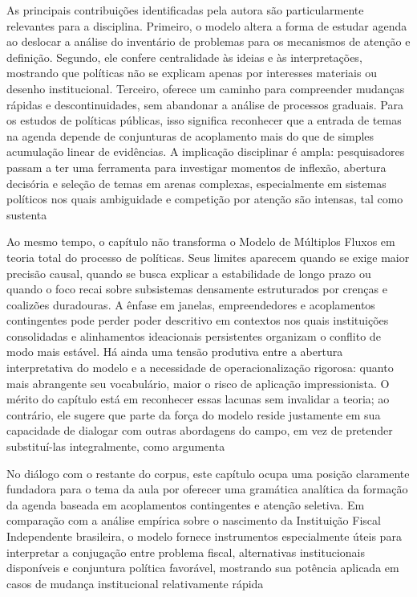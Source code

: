 \documentclass[12pt,a4paper]{article}
\begin{document}
As principais contribuições identificadas pela autora são particularmente relevantes para a disciplina. Primeiro, o modelo altera a forma de estudar agenda ao deslocar a análise do inventário de problemas para os mecanismos de atenção e definição. Segundo, ele confere centralidade às ideias e às interpretações, mostrando que políticas não se explicam apenas por interesses materiais ou desenho institucional. Terceiro, oferece um caminho para compreender mudanças rápidas e descontinuidades, sem abandonar a análise de processos graduais. Para os estudos de políticas públicas, isso significa reconhecer que a entrada de temas na agenda depende de conjunturas de acoplamento mais do que de simples acumulação linear de evidências. A implicação disciplinar é ampla: pesquisadores passam a ter uma ferramenta para investigar momentos de inflexão, abertura decisória e seleção de temas em arenas complexas, especialmente em sistemas políticos nos quais ambiguidade e competição por atenção são intensas, tal como sustenta\parencite{brasil2022_abordagens_contemporaneas}

Ao mesmo tempo, o capítulo não transforma o Modelo de Múltiplos Fluxos em teoria total do processo de políticas. Seus limites aparecem quando se exige maior precisão causal, quando se busca explicar a estabilidade de longo prazo ou quando o foco recai sobre subsistemas densamente estruturados por crenças e coalizões duradouras. A ênfase em janelas, empreendedores e acoplamentos contingentes pode perder poder descritivo em contextos nos quais instituições consolidadas e alinhamentos ideacionais persistentes organizam o conflito de modo mais estável. Há ainda uma tensão produtiva entre a abertura interpretativa do modelo e a necessidade de operacionalização rigorosa: quanto mais abrangente seu vocabulário, maior o risco de aplicação impressionista. O mérito do capítulo está em reconhecer essas lacunas sem invalidar a teoria; ao contrário, ele sugere que parte da força do modelo reside justamente em sua capacidade de dialogar com outras abordagens do campo, em vez de pretender substituí-las integralmente, como argumenta\parencite{brasil2022_abordagens_contemporaneas}

No diálogo com o restante do corpus, este capítulo ocupa uma posição claramente fundadora para o tema da aula por oferecer uma gramática analítica da formação da agenda baseada em acoplamentos contingentes e atenção seletiva. Em comparação com a análise empírica sobre o nascimento da Instituição Fiscal Independente brasileira, o modelo fornece instrumentos especialmente úteis para interpretar a conjugação entre problema fiscal, alternativas institucionais disponíveis e conjuntura política favorável, mostrando sua potência aplicada em casos de mudança institucional relativamente rápida\parencite{anonsd_sem_titulo,brasil2022_abordagens_contemporaneas}
\end{document}
